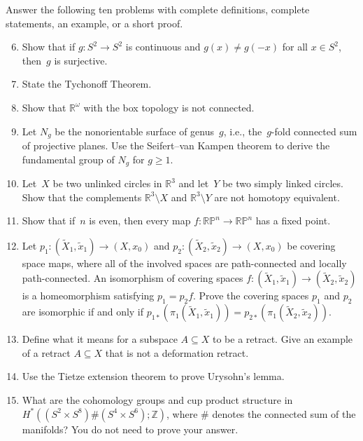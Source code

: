 \documentclass[11pt,letterpaper]{article}
\newenvironment{examproblems}[2]{%
  \def\ProblemHeadingTag{#2}%
  \AssignTaggingSocketPlug{block/list/label}{examproblem}%
  \begin{enumerate}%
  \setcounter{enumi}{#1}%
  \renewcommand{\labelenumi}{\textbf{\theenumi.}}%
  \setlength{\topsep}{0.35em}%
  \setlength{\partopsep}{0pt}%
  \setlength{\itemsep}{0.48em}%
  \setlength{\parsep}{0.18em}%
}{\end{enumerate}}
\newenvironment{examinstructions}{%
  \par\begingroup\itshape
}{%
  \par\endgroup\vspace{0.18em}
}
\begin{document}
\begin{examinstructions}
Answer the following ten problems with complete definitions, complete statements, an example, or a short proof.
\end{examinstructions}
\begin{examproblems}{5}{H2}
\def\ProblemHeadingText{Problem 6.}
\item
Show that if \(g:S^2\to S^2\) is continuous and \(g(x)\ne g(-x)\) for all \(x\in S^2\), then~\(g\) is surjective.
\def\ProblemHeadingText{Problem 7.}
\item
State the Tychonoff Theorem.
\def\ProblemHeadingText{Problem 8.}
\item
Show that \(\mathbb{R}^{\omega}\) with the box topology is not connected.
\def\ProblemHeadingText{Problem 9.}
\item
Let \(N_g\) be the nonorientable surface of genus~\(g\), i.e., the~\(g\)-fold connected sum of projective planes. Use the Seifert–van Kampen theorem to derive the fundamental group of \(N_g\) for \(g\ge 1\).
\def\ProblemHeadingText{Problem 10.}
\item
Let~\(X\) be two unlinked circles in \(\mathbb{R}^3\) and let~\(Y\) be two simply linked circles. Show that the complements \(\mathbb{R}^3\setminus X\) and \(\mathbb{R}^3\setminus Y\) are not homotopy equivalent.
\def\ProblemHeadingText{Problem 11.}
\item
Show that if~\(n\) is even, then every map \(f:\mathbb{RP}^n\to\mathbb{RP}^n\) has a fixed point.
\def\ProblemHeadingText{Problem 12.}
\item
Let \(p_1:(\widetilde{X}_1,\widetilde{x}_1)\to(X,x_0)\) and \(p_2:(\widetilde{X}_2,\widetilde{x}_2)\to(X,x_0)\) be covering space maps, where all of the involved spaces are path-connected and locally path-connected. An isomorphism of covering spaces \(f:(\widetilde{X}_1,\widetilde{x}_1)\to(\widetilde{X}_2,\widetilde{x}_2)\) is a homeomorphism satisfying \(p_1=p_2f\). Prove the covering spaces \(p_1\) and \(p_2\) are isomorphic if and only if \(p_{1*}(\pi_1(\widetilde{X}_1,\widetilde{x}_1))=p_{2*}(\pi_1(\widetilde{X}_2,\widetilde{x}_2))\).
\def\ProblemHeadingText{Problem 13.}
\item
Define what it means for a subspace \(A\subseteq X\) to be a retract. Give an example of a retract \(A\subseteq X\) that is not a deformation retract.
\def\ProblemHeadingText{Problem 14.}
\item
Use the Tietze extension theorem to prove Urysohn’s lemma.
\def\ProblemHeadingText{Problem 15.}
\item
What are the cohomology groups and cup product structure in \(H^*((S^2\times S^8)\#(S^4\times S^6);\mathbb{Z})\), where \(\#\) denotes the connected sum of the manifolds? You do not need to prove your answer.
\end{examproblems}
\end{document}
